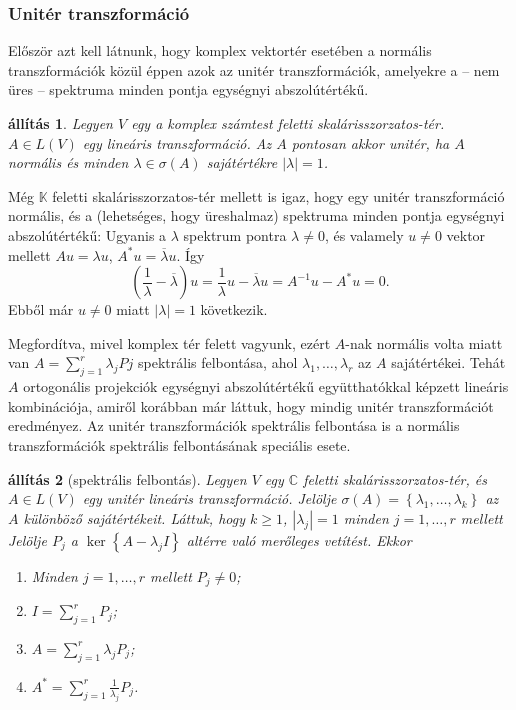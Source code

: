 \documentclass[9pt, a4paper, showtrims]{memoir}
\makeatletter
\renewenvironment{proof}[1][\proofname]
    {\par\pushQED{\qed}%
    \normalfont \topsep6\p@\@plus6\p@\relax
    \trivlist
    \item[\hskip\labelsep
        \itshape
    #1\@addpunct{:}]\ignorespaces}
    {\popQED\endtrivlist\@endpefalse}
\theoremstyle{plain}
\newtheorem{proposition}{állítás}[chapter]
\theoremstyle{remark}
\theoremstyle{definition}
\makeatother
\begin{document}
\subsubsection{Unitér transzformáció}
Először azt kell látnunk,
hogy komplex vektortér esetében a normális transzformációk közül éppen azok az unitér transzformációk,
amelyekre a -- nem üres -- spektruma minden pontja egységnyi abszolútértékű.
\begin{proposition}
	Legyen $V$ egy a komplex számtest feletti skalárisszorzatos-tér.
	$A\in L\left( V \right)$ egy lineáris transzformáció.
	Az $A$ pontosan akkor unitér, ha $A$ normális és minden $\lambda\in\sigma\left( A \right)$ sajátértékre
	$|\lambda|=1$.
\end{proposition}
\begin{proof}
	Még $\mathbb{K}$ feletti skalárisszorzatos-tér mellett is igaz,
	hogy egy unitér transzformáció normális,
	és a (lehetséges, hogy üreshalmaz) spektruma minden pontja egységnyi abszolútértékű:
	Ugyanis a $\lambda$ spektrum pontra $\lambda\neq 0$,
	és valamely $u\neq 0$ vektor mellett
	$Au=\lambda u$, $A^\ast u=\overline{\lambda}u$. Így
	\[
		\left( \frac{1}{\lambda}-\overline{\lambda} \right)u
		=
		\frac{1}{\lambda}u-\overline{\lambda}u
		=
		A^{-1}u-A^\ast u
		=0.
	\]
	Ebből már
	$u\neq 0$ miatt $|\lambda|=1$ következik.

	Megfordítva,
	mivel komplex tér felett vagyunk,
	ezért $A$-nak normális volta miatt van
	$A=\sum_{j=1}^r\lambda_jPj$ spektrális felbontása,
	ahol $\lambda_1,\ldots,\lambda_r$ az $A$ sajátértékei.
	Tehát $A$ ortogonális projekciók egységnyi abszolútértékű együtthatókkal képzett lineáris kombinációja,
	amiről korábban már láttuk, hogy mindig unitér transzformációt eredményez.
\end{proof}
Az unitér transzformációk spektrális felbontása is
a normális transzformációk spektrális felbontásának speciális esete.
\begin{proposition}[spektrális felbontás]
	Legyen $V$ egy $\mathbb{C}$ feletti skalárisszorzatos-tér, és $A\in L\left( V \right)$
	egy unitér lineáris transzformáció.
	Jelölje $\sigma\left( A \right)=\left\{\lambda_1,\ldots,\lambda_k  \right\}$ az $A$ különböző sajátértékeit.
	Láttuk, hogy $k\geq 1$, $|\lambda_j|=1$ minden $j=1,\ldots,r$ mellett
	Jelölje $P_j$ a $\ker\left\{ A-\lambda_jI \right\}$ altérre való merőleges vetítést.
	Ekkor
	\begin{enumerate}
		\item Minden $j=1,\ldots,r$ mellett $P_j\neq 0$;
		\item $I=\sum_{j=1}^rP_j$;
		\item $A=\sum_{j=1}^r\lambda_jP_j$;
		\item $A^\ast=\sum_{j=1}^r\frac{1}{\lambda_j}P_j$.
		      \qedhere
	\end{enumerate}
\end{proposition}
\end{document}
